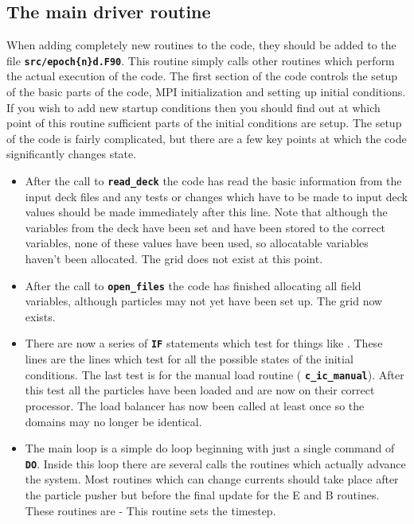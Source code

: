\documentclass[12pt,a4paper]{article}
\newcommand{\inlinecode}[1]{{\color{warwickred} \bf\texttt{#1}}}
\begin{document}
\subsection{The main driver routine}
When adding completely new routines to the code, they should be added to the
file \inlinecode{src/epoch\{n\}d.F90}. This routine simply calls other routines
which perform the actual execution of the code. The first section of the code
controls the setup of the basic parts of the code, MPI initialization and
setting up initial conditions. If you wish to add new startup conditions then
you should find out at which point of this routine sufficient parts of the
initial conditions are setup. The setup of the code is fairly complicated, but
there are a few key points at which the code significantly changes state.
\begin{itemize}
\item After the call to \inlinecode{read\_deck} the code has read the basic
  information from the input deck files and any tests or changes which have to
  be made to input deck values should be made immediately after this line. Note
  that although the variables from the deck have been set and have been stored
  to the correct variables, none of these values have been used, so allocatable
  variables haven't been allocated. The grid does not exist at this point.
\item After the call to \inlinecode{open\_files} the code has finished
  allocating all field variables, although particles may not yet have been set
  up. The grid now exists.
\item There are now a series of \inlinecode{IF} statements which test for
  things like \linebreak\inlinecode{IF (IOR(ictype, c\_ic\_autoload) .NE. 0)}. These lines
  are the lines which test for all the possible states of the initial
  conditions. The last test is for the manual load routine
  (\inlinecode{c\_ic\_manual}). After this test all the particles have been
  loaded and are now on their correct processor. The load balancer has now been
  called at least once so the domains may no longer be identical.
\item The main loop is a simple do loop beginning with just a single command of
  \inlinecode{DO}. Inside this loop there are several calls the routines which
  actually advance the system. Most routines which can change currents should
  take place after the particle pusher but before the final update for the E
  and B routines. These routines are
  \subitem \inlinecode{set\_dt} - This routine sets the timestep.

\end{itemize}
\end{document}
